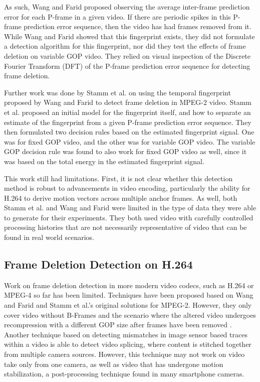 As such, Wang and Farid proposed observing the average inter-frame prediction error for each P-frame in a given video. If there are periodic spikes in this P-frame prediction error sequence, then the video has had frames removed from it. While Wang and Farid showed that this fingerprint exists, they did not formulate a detection algorithm for this fingerprint, nor did they test the effects of frame deletion on variable GOP video. They relied on visual inspection of the Discrete Fourier Transform (DFT) of the P-frame prediction error sequence for detecting frame deletion.

Further work was done by Stamm et al. \cite{stamm} \cite{C} on using the temporal fingerprint proposed by Wang and Farid to detect frame deletion in MPEG-2 video. Stamm et al. proposed an initial model for the fingerprint itself, and how to separate an estimate of the fingerprint from a given P-frame prediction error sequence. They then formulated two decision rules based on the estimated fingerprint signal. One was for fixed GOP video, and the other was for variable GOP video. The variable GOP decision rule was found to also work for fixed GOP video as well, since it was based on the total energy in the estimated fingerprint signal.

This work still had limitations. First, it is not clear whether this detection method is robust to advancements in video encoding, particularly the ability for H.264 to derive motion vectors across multiple anchor frames. As well, both Stamm et al. and Wang and Farid were limited in the type of data they were able to generate for their experiments. They both used video with carefully controlled processing histories that are not necessarily representative of video that can be found in real world scenarios.

\subsection{Frame Deletion Detection on H.264}

Work on frame deletion detection in more modern video codecs, such as H.264 or MPEG-4 so far has been limited. Techniques have been proposed based on Wang and Farid and Stamm et al.'s original solutions for MPEG-2. However, they only cover video without B-Frames and the scenario where the altered video undergoes recompression with a different GOP size after frames have been removed \cite{Liu}. Another technique based on detecting mismatches in image sensor based traces within a video \cite{Mandelli} is able to detect video splicing, where content is stitched together from multiple camera sources. However, this technique may not work on video take only from one camera, as well as video that has undergone motion stabilization, a post-processing technique found in many smartphone cameras.

